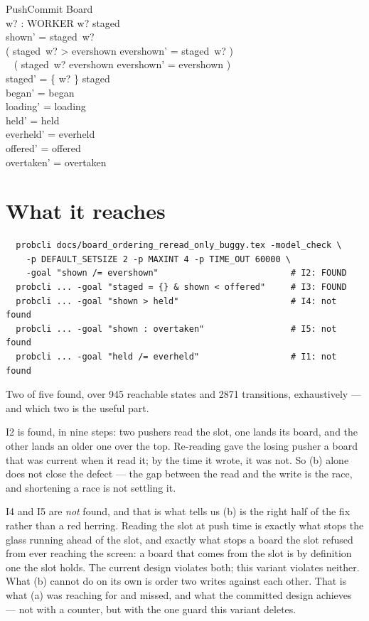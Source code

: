 \documentclass[a4paper,10pt,fleqn]{article}
\begin{document}
\begin{schema}{PushCommit}
  \Delta Board \\
  w? : WORKER
\where
  w? \in \dom staged \\
  shown' = staged~w? \\
  ( staged~w? > evershown \land evershown' = staged~w? ) \lor \\
  \quad~ ( staged~w? \leq evershown \land evershown' = evershown ) \\
  staged' = \{ w? \} \ndres staged \\
  began' = began \\
  loading' = loading \\
  held' = held \\
  everheld' = everheld \\
  offered' = offered \\
  overtaken' = overtaken
\end{schema}

\section{What it reaches}

\begin{verbatim}
  probcli docs/board_ordering_reread_only_buggy.tex -model_check \
    -p DEFAULT_SETSIZE 2 -p MAXINT 4 -p TIME_OUT 60000 \
    -goal "shown /= evershown"                          # I2: FOUND
  probcli ... -goal "staged = {} & shown < offered"     # I3: FOUND
  probcli ... -goal "shown > held"                      # I4: not found
  probcli ... -goal "shown : overtaken"                 # I5: not found
  probcli ... -goal "held /= everheld"                  # I1: not found
\end{verbatim}

Two of five found, over 945 reachable states and 2871 transitions, exhaustively
--- and which two is the useful part.

I2 is found, in nine steps: two pushers read the slot, one lands its board, and
the other lands an older one over the top. Re-reading gave the losing pusher a
board that was current when it read it; by the time it wrote, it was not. So (b)
alone does not close the defect --- the gap between the read and the write is
the race, and shortening a race is not settling it.

I4 and I5 are \emph{not} found, and that is what tells us (b) is the right half
of the fix rather than a red herring. Reading the slot at push time is exactly
what stops the glass running ahead of the slot, and exactly what stops a board
the slot refused from ever reaching the screen: a board that comes from the slot
is by definition one the slot holds. The current design violates both; this
variant violates neither. What (b) cannot do on its own is order two writes
against each other. That is what (a) was reaching for and missed, and what the
committed design achieves --- not with a counter, but with the one guard this
variant deletes.
\end{document}
